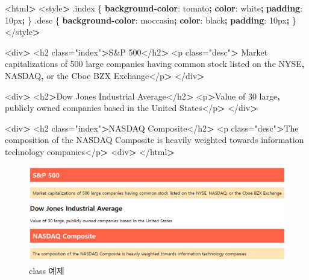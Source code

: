 \documentclass[12pt,]{book}
\newenvironment{Shaded}{\begin{snugshade}}{\end{snugshade}}
\newcommand{\ConstantTok}[1]{\textcolor[rgb]{0.00,0.00,0.00}{#1}}
\newcommand{\DataTypeTok}[1]{\textcolor[rgb]{0.13,0.29,0.53}{#1}}
\newcommand{\DecValTok}[1]{\textcolor[rgb]{0.00,0.00,0.81}{#1}}
\newcommand{\FunctionTok}[1]{\textcolor[rgb]{0.00,0.00,0.00}{#1}}
\newcommand{\KeywordTok}[1]{\textcolor[rgb]{0.13,0.29,0.53}{\textbf{#1}}}
\newcommand{\NormalTok}[1]{#1}
\newcommand{\OperatorTok}[1]{\textcolor[rgb]{0.81,0.36,0.00}{\textbf{#1}}}
\begin{document}
\begin{Shaded}
\begin{Highlighting}[]
\NormalTok{<html}\OperatorTok{>}
\NormalTok{<style}\OperatorTok{>}
\FunctionTok{.index}\NormalTok{ \{}
  \KeywordTok{background-color}\NormalTok{: }\ConstantTok{tomato}\OperatorTok{;}
\KeywordTok{color}\NormalTok{: }\ConstantTok{white}\OperatorTok{;}
\KeywordTok{padding}\NormalTok{: }\DecValTok{10}\DataTypeTok{px}\OperatorTok{;}
\NormalTok{\} }
\FunctionTok{.desc}\NormalTok{ \{}
  \KeywordTok{background-color}\NormalTok{: }\ConstantTok{moccasin}\OperatorTok{;}
  \KeywordTok{color}\NormalTok{: }\ConstantTok{black}\OperatorTok{;}
  \KeywordTok{padding}\NormalTok{: }\DecValTok{10}\DataTypeTok{px}\OperatorTok{;}
\NormalTok{\} }
\NormalTok{</style}\OperatorTok{>}

\NormalTok{<div}\OperatorTok{>}
\NormalTok{<h2 class="index"}\OperatorTok{>}\NormalTok{S&P 500</h2}\OperatorTok{>}
\NormalTok{<p class="desc"}\OperatorTok{>}\NormalTok{ Market capitalizations of 500 large companies}
\NormalTok{having common stock listed on the NYSE}\OperatorTok{,}\NormalTok{ NASDAQ}\OperatorTok{,}
\NormalTok{or the Cboe BZX Exchange</p}\OperatorTok{>}
\NormalTok{</div}\OperatorTok{>}

\NormalTok{<div}\OperatorTok{>}
\NormalTok{<h2}\OperatorTok{>}\NormalTok{Dow Jones Industrial Average</h2}\OperatorTok{>}
\NormalTok{<p}\OperatorTok{>}\NormalTok{Value of 30 large}\OperatorTok{,}\NormalTok{ publicly owned companies}
\NormalTok{based in the United States</p}\OperatorTok{>}
\NormalTok{</div}\OperatorTok{>}

\NormalTok{<div}\OperatorTok{>}
\NormalTok{<h2 class="index"}\OperatorTok{>}\NormalTok{NASDAQ Composite</h2}\OperatorTok{>}
\NormalTok{<p class="desc"}\OperatorTok{>}\NormalTok{The composition of the NASDAQ Composite is}
\NormalTok{heavily weighted towards information technology companies</p}\OperatorTok{>}
\NormalTok{<div}\OperatorTok{>}
\NormalTok{</html}\OperatorTok{>}
\end{Highlighting}
\end{Shaded}

\begin{figure}[h]

{\centering \includegraphics[width=0.7\linewidth]{images/html_9} 

}

\caption{class 예제}\label{fig:unnamed-chunk-22}
\end{figure}
\end{document}
